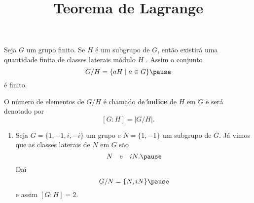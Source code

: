 \documentclass{beamer}
\title{Teorema de Lagrange}
\author[\autor]{\autor}
\institute[\instituto]{\instituto}
\date{}
\begin{document}
    \begin{frame}
        \maketitle
    \end{frame}


    \begin{frame}
        Seja $G$ um grupo finito. \pause Se $H$ \'e um subgrupo de $G$, \pause ent\~ao existir\'a uma quantidade finita de classes laterais m\'odulo $H$ \pause.
        Assim o conjunto
        \[
            G/H = \{aH \mid a \in G\} \pause
        \]
        \'e finito. \pause

        O n\'umero de elementos de $G/H$ \pause \'e chamado de \textbf{{\'\i}ndice} \pause de $H$ em $G$ \pause e ser\'a denotado por
        \[
            [G : H] = |G/H|.
        \]
    \end{frame}

    \begin{frame}
        \begin{exemplos}
            \begin{enumerate}[label=({\arabic*})]
                \item Seja $G = \{1, -1, i, -i\}$ um grupo \pause e $N = \{1, -1\}$ \pause um subgrupo de $G$. \pause J\'a vimos que as classes laterais de $N$ em $G$ s\~ao \pause
                \[
                    N \quad \mbox{e}\quad iN. \pause
                \]
                Da{\'\i}
                \[
                    G/N = \{N, iN\} \pause
                \]
                e assim $[G : H] = 2$.

                \seti
            \end{enumerate}
        \end{exemplos}
    \end{frame}
\end{document}
